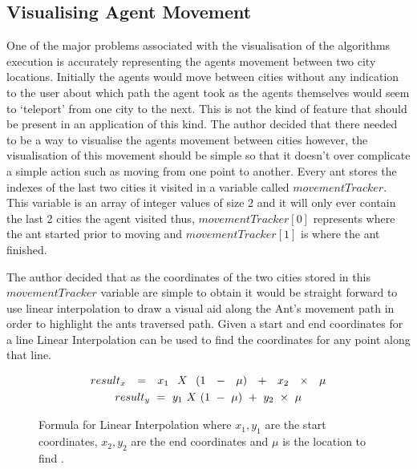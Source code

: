 \subsection{Visualising Agent Movement}
\label{visy}
One of the major problems associated with the visualisation of the algorithms execution is accurately representing the agents movement between two city locations. Initially the agents would move between cities without any indication to the user about which path the agent took as the agents themselves would seem to `teleport' from one city to the next. This is not the kind of feature that should be present in an application of this kind. The author decided that there needed to be a way to visualise the agents movement between cities however, the visualisation of this movement should be simple so that it doesn’t over complicate a simple action such as moving from one point to another. Every ant stores the indexes of the last two cities it visited in a variable called $movementTracker$. This variable is an array of integer values of size 2 and it will only ever contain the last 2 cities the agent visited thus, $movementTracker[0]$ represents where the ant started prior to moving and $movementTracker[1]$ is where the ant finished.

The author decided that as the coordinates of the two cities stored in this $movementTracker$ variable are simple to obtain it would be straight forward to use linear interpolation to draw a visual aid along the Ant's movement path in order to highlight the ants traversed path. Given a start and end coordinates for a line Linear Interpolation can be used to find the coordinates for any point along that line. 

\begin{figure}[H]
\centering
\begin{gather*}
\Huge
result_x\ =\ x_1\ X\ (1\ -\ \mu)\ +\ x_2\ \times\ \mu \\
result_y\ =\ y_1\ X\ (1\ -\ \mu)\ +\ y_2\ \times\ \mu
\end{gather*}
\caption[Linear Interpolation Formula]{Formula for Linear Interpolation where $x_1,y_1$ are the start coordinates, $x_2, y_2$ are the end coordinates and $\mu$ is the location to find \cite{interpolation:site}.}
\label{fig:interPolateEqn}
\end{figure}

